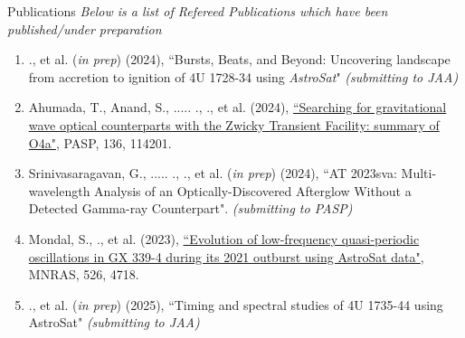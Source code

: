 \begin{rSection}{Publications} 
\hspace{-1em} {\textit{Below is a list of Refereed Publications which have been published/under preparation}}
\vspace{-0.5em}
\begin{enumerate}[itemsep=-0.5em, leftmargin=0.5em] %
    \item \me., et al. (\textit{in prep}) (2024), {``Bursts, Beats, and Beyond: Uncovering landscape from accretion to ignition of 4U 1728-34 using \textit{AstroSat}"} \textit{(submitting to JAA)}
    \item Ahumada, T., Anand, S., ..... ., \me ., et al. (2024), {\href{https://iopscience.iop.org/article/10.1088/1538-3873/ad8265}{``Searching for gravitational wave optical counterparts with the Zwicky Transient Facility: summary of O4a"}}, PASP, 136, 114201.
    \item Srinivasaragavan, G., ..... ., \me., et al. (\textit{in prep}) (2024), {``AT 2023sva: Multi-wavelength Analysis of an Optically-Discovered Afterglow Without a Detected Gamma-ray Counterpart"}. \textit{(submitting to PASP)}
    \item Mondal, S., \me., et al. (2023), {\href{https://ui.adsabs.harvard.edu/link_gateway/2023MNRAS.526.4718M/doi:10.1093/mnras/stad3079}{``Evolution of low-frequency quasi-periodic oscillations in GX 339-4 during its 2021 outburst using AstroSat data"}}, MNRAS, 526, 4718. 
    \item \me., et al. (\textit{in prep}) (2025), {``Timing and spectral studies of 4U 1735-44 using AstroSat"} \textit{(submitting to JAA)}
\end{enumerate}


\end{rSection}
